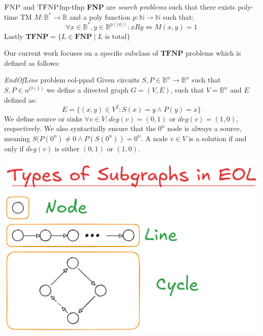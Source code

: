 \begin{definitionbox}{$\textnormal{\textsc{FNP}}$ and $\textnormal{\textsc{TFNP}}$}{fnp-tfnp}
    \textbf{FNP} are \textit{search problems} such that there exists poly-time TM $M: \mathbb{B}^* \to \mathbb{B}$
    and a poly function $p : \mathbb{N} \to \mathbb{N}$ such that:
    $$
    \forall x \in \mathbb{B}^*, y \in \mathbb{B}^{p(|x|)}: xRy \iff M(x,y) = 1
    $$
    Lastly $\textbf{TFNP} = \{L \in \textbf{FNP} \mid L \text{ is total}\}$
\end{definitionbox}

%


Our current work focuses on a specific subclass of $\textbf{TFNP}$ problems
which is defined as follows:

\begin{minipage}{0.55\linewidth}
\begin{definitionbox}{\textit{EndOfLine} problem \cite{papadimitriou_ComplexityParityArgument_1994}}{eol-ppad}
    Given circuits $S, P \in \mathbb{B}^n \to \mathbb{B}^n$ such that $S,P \in n^{O(1)}$
    we define a directed graph $G = (V,E)$, such that $V= \mathbb{B}^n$ and $E$ defined as:
    $$
    E = \{(x,y) \in V^2: S(x) = y \wedge P(y) = x\}
    $$
    We define source or sinks $\forall v \in V: \textit{deg}(v) = (0,1)$ or
    $\textit{deg}(v) = (1,0)$, respectively. 
    We also syntactially ensure that the $0^n$ node is always a source, meaning
    $S(P(0^n) \neq 0 \wedge P(S(0^n)) = 0^n$.
    A node $v \in V$ is a solution if and only if $\textit{deg}(v)$ is either
    $(0,1)$  or $(1,0)$.
\end{definitionbox}
\end{minipage}
\begin{minipage}{0.45\linewidth}
    \centering
    \includegraphics[width=0.7\linewidth]{assets/eol-subgraphs.png}
    \label{fig:eol-subgraphs}
\end{minipage}

